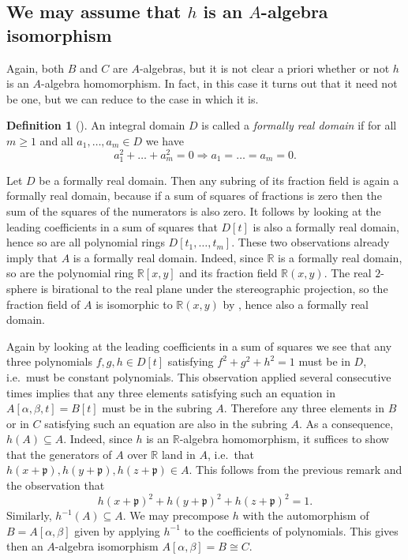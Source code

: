 \documentclass[A4paper, 12pt, british, reqno]{amsart}
\newcommand{\R}{\mathbb{R}} %
\newcommand{\p}{\mathfrak{p}}
\theoremstyle{plain}
\theoremstyle{definition}
\newtheorem{defn}[thm]{Definition}
\theoremstyle{remark}
\theoremstyle{plain}
\theoremstyle{definition}
\theoremstyle{remark}
\theoremstyle{plain}
\theoremstyle{definition}
\theoremstyle{remark}
\begin{document}
\subsection{We may assume that $h$ is an $A$-algebra isomorphism}
Again, both $B$ and $C$ are $A$-algebras, but it is not clear a priori whether or not $h$ is an $A$-algebra homomorphism.
In fact, in this case it turns out that it need not be one, but we can reduce to the case in which it is.

\begin{defn}[{\cite[\S 10.1.5]{fre17}}]
    An integral domain $D$ is called a \textit{formally real domain} if for all $m\geqslant 1$ and all $a_{1},\ldots,a_{m}\in D$ we have
    \[ a_{1}^{2}+\ldots+a_{m}^{2}=0 \Rightarrow a_{1}=\ldots=a_{m}=0. \]
\end{defn}

Let $D$ be a formally real domain.
Then  any subring of its fraction field is again a formally real domain, because if a sum of squares of fractions is zero then the sum of the squares of the numerators is also zero.
It follows by looking at the leading coefficients in a sum of squares that $D[t]$ is also a formally real domain, hence so are all polynomial rings $D[t_{1},\ldots,t_{m}]$.
These two observations already imply that $A$ is a formally real domain.
Indeed, since $\R$ is a formally real domain, so are the polynomial ring $\R[x,y]$ and its fraction field $\R(x,y)$.
The real $2$-sphere is birational to the real plane under the stereographic projection, so the fraction field of $A$ is isomorphic to $\R(x,y)$ by \cite[Lemma 9.33]{gw10}, hence also a formally real domain.

Again by looking at the leading coefficients in a sum of squares we see that any three polynomials $f,g,h\in D[t]$ satisfying $f^{2}+g^{2}+h^{2}=1$ must be in $D$, i.e.~must be constant polynomials.
This observation applied several consecutive times implies that any three elements satisfying such an equation in $A[\alpha,\beta,t]=B[t]$ must be in the subring $A$.
Therefore any three elements in $B$ or in $C$ satisfying such an equation are also in the subring $A$.
As a consequence, $h(A)\subseteq A$.
Indeed, since $h$ is an $\R$-algebra homomorphism, it suffices to show that the generators of $A$ over $\R$ land in $A$, i.e.~that $h(x+\p),h(y+\p),h(z+\p)\in A$.
This follows from the previous remark and the observation that
\[ h(x+\p)^{2}+h(y+\p)^{2}+h(z+\p)^{2}=1. \]
Similarly, $h^{-1}(A)\subseteq A$.
We may precompose $h$ with the automorphism of $B=A[\alpha,\beta]$ given by applying $h^{-1}$ to the coefficients of polynomials.
This gives then an $A$-algebra isomorphism $A[\alpha,\beta]=B\cong C$.
\end{document}
